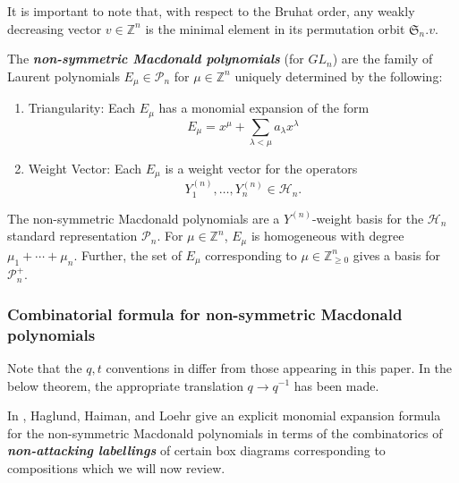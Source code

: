 It is important to note that, with respect to the Bruhat order, any weakly decreasing vector $v \in \mathbb{Z}^n$ is the minimal element in its permutation orbit $\mathfrak{S}_n.v$.


\begin{defi} \label{defn3}
The \textbf{\textit{non-symmetric Macdonald polynomials}} (for $GL_n$) are the family of Laurent polynomials $E_{\mu} \in \mathscr{P}_n$ for $\mu \in \mathbb{Z}^n$ uniquely determined by the following:

\begin{enumerate}
    \item Triangularity: Each $E_{\mu}$ has a monomial expansion of the form $$E_{\mu} = x^{\mu} + \sum_{\lambda < \mu} a_{\lambda}x^{\lambda}$$
    
    
    \item Weight Vector: Each  $E_{\mu}$ is a weight vector for the operators $$Y_1^{(n)},\ldots,Y_n^{(n)} \in \mathscr{H}_n.$$
\end{enumerate}
\end{defi}

The non-symmetric Macdonald polynomials are a $Y^{(n)}$-weight basis for the $\mathscr{H}_n$ standard representation $\mathscr{P}_n$. For $\mu \in \mathbb{Z}^n$, $E_{\mu}$ is homogeneous with degree $\mu_1+\cdots +\mu_n$. Further, the set of $E_{\mu}$ corresponding to $\mu \in \mathbb{Z}_{\geq 0}^n$ gives a basis for $\mathscr{P}_n ^{+}$.

\subsubsection{Combinatorial formula for non-symmetric Macdonald polynomials}

Note that the $q,t$ conventions in \cite{haglund2007combinatorial} differ from those appearing in this paper. In the below theorem, the appropriate translation $q \rightarrow q^{-1}$ has been made.

In \cite{haglund2007combinatorial}, Haglund, Haiman, and Loehr give an explicit monomial expansion formula for the non-symmetric Macdonald polynomials in terms of the combinatorics of \textbf{\textit{non-attacking labellings}} of certain box diagrams corresponding to compositions which we will now review.

